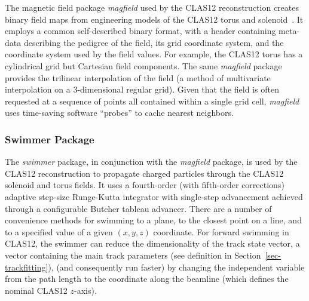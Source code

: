 The magnetic field package {\it magfield} used by the CLAS12 reconstruction creates binary field maps from
engineering models of the CLAS12 torus and solenoid~\cite{magnets-nim}. It employs a common self-described
binary format, with a header containing meta-data describing the pedigree of the field, its grid coordinate system,
and the coordinate system used by the field values. For example, the CLAS12 torus has a cylindrical grid but
Cartesian field components. The same {\it magfield} package provides the trilinear interpolation of the field (a
method of multivariate interpolation on a 3-dimensional regular grid). Given that the field is often requested at a
sequence of points all contained within a single grid cell, {\it magfield} uses time-saving software “probes” to cache
nearest neighbors.

\subsubsection{Swimmer Package}

The {\it swimmer} package, in conjunction with the {\it magfield} package, is used by the CLAS12 reconstruction
to propagate charged particles through the CLAS12 solenoid and torus fields. It uses a fourth-order (with
fifth-order corrections) adaptive step-size Runge-Kutta integrator with single-step advancement achieved through
a configurable Butcher tableau advancer. There are a number of convenience methods for swimming to a plane, to
the closest point on a line, and to a specified value of a given $(x,y,z)$ coordinate. For forward swimming in CLAS12,
the swimmer can reduce the dimensionality of the track state vector, a vector containing the main track parameters
(see definition in Section~\ref{sec-trackfitting}), (and consequently run faster) by changing the independent variable
from the path length to the coordinate along the beamline (which defines the nominal CLAS12 $z$-axis).
